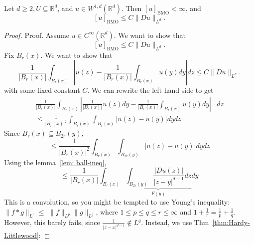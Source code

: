 \begin{theorem}
    \label{thm: BMO-Sobolev-eq}
    Let $d \geq 2, U \subseteq \mathbb{R}^{d}$, and $u \in W^{1, d}\left(\mathbb{R}^{d}\right)$. Then $[u]_{\mathrm{BMO}}<\infty$, and
    $$
    [u]_{\mathrm{BMO}} \leq C\|D u\|_{L^{d}} .
    $$
\end{theorem}
\begin{proof}
    Proof. Assume $u \in C^{\infty}\left(\mathbb{R}^{d}\right)$. We want to show that
    $$
    [u]_{\mathrm{BMO}} \leq C\|D u\|_{L^{d}} .
    $$
    Fix $B_{r}(x)$. We want to show that
    $$
    \frac{1}{\left|B_{r}(x)\right|} \int_{B_{r}(x)}\left|u(z)-\frac{1}{\left|B_{r}(x)\right|} \int_{B_{r}(x)} u(y) d y\right| d z \leq C\|D u\|_{L^{d}} .
    $$
    with some fixed constant $C$. We can rewrite the left hand side to get
    $$
    \begin{aligned}
    \frac{1}{\left|B_{r}(x)\right|} \int_{B_{r}(x)}\left|\frac{1}{\left|B_{r}(x)\right|} u(z) d y-\frac{1}{\left|B_{r}(x)\right|} \int_{B_{r}(x)} u(y) d y\right| & d z \\
    \leq \frac{1}{\left|B_{r}(x)\right|^{2}} \int_{B_{r}(x)} \int_{B_{r}(x)}|u(z)-u(y)| d y d z
    \end{aligned}
    $$
    Since $B_{r}(x) \subseteq B_{2 r}(y)$,
    $$
    \leq \frac{1}{\left|B_{r}(x)\right|^{2}} \int_{B_{r}(x)} \int_{B_{2 r}(y)}|u(z)-u(y)| d y d z
    $$
    Using the lemma~\ref{lem: ball-ineq},
    $$
    \leq \frac{1}{\left|B_{r}(x)\right|} \int_{B_{r}(x)} \underbrace{\int_{B_{2 r}(y)} \frac{|D u(z)|}{|z-y|^{d-1}} d z}_{F(y)} d y
    $$
    This is a convolution, so you might be tempted to use Young's inequality: $\|f * g\|_{L^{r}} \leq$ $\|f\|_{L^{p}}\|g\|_{L^{q}}$, where $1 \leq p \leq q \leq r \leq \infty$ and $1+\frac{1}{r}=\frac{1}{p}+\frac{1}{q}$. However, this barely fails, since $\frac{1}{|z-x|^{d-1}} \notin L^{q}$. Instead, we use Thm~\ref{thm:Hardy-Littlewood}:


\end{proof}
